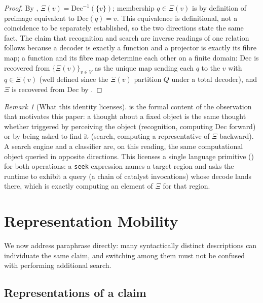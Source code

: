 \documentclass[11pt,twocolumn,a4paper]{article}
\theoremstyle{thmstyle}
\theoremstyle{definition}
\theoremstyle{remark}
\newtheorem{remark}[theorem]{Remark}
\newcommand{\V}{V}
\newcommand{\Proj}{\Xi}
\begin{document}
\begin{proof}
By , $\Proj(v)=\mathrm{Dec}^{-1}(\{v\})$; membership
$q\in\Proj(v)$ is by definition of preimage equivalent to
$\mathrm{Dec}(q)=v$. This equivalence is definitional, not a coincidence to
be separately established, so the two directions state the same fact. The
claim that recognition and search are inverse readings of one relation
follows because a decoder is exactly a function and a projector is exactly
its fibre map; a function and its fibre map determine each other on a
finite domain: $\mathrm{Dec}$ is recovered from $\{\Proj(v)\}_{v\in\V}$ as
the unique map sending each $q$ to the $v$ with $q\in\Proj(v)$ (well
defined since the $\Proj(v)$ partition $Q$ under a total decoder), and
$\Proj$ is recovered from $\mathrm{Dec}$ by .
\end{proof}

\begin{remark}[What this identity licenses]
\label{rem:identity-licenses}
 is the formal content of the observation
that motivates this paper: a thought about a fixed object is the same
thought whether triggered by perceiving the object (recognition, computing
$\mathrm{Dec}$ forward) or by being asked to find it (search, computing a
representative of $\Proj$ backward). A search engine and a classifier are,
on this reading, the same computational object queried in opposite
directions. This licenses a single language primitive
() for both operations: a \texttt{seek} expression names
a target region and asks the runtime to exhibit a query (a chain of
catalyst invocations) whose decode lands there, which is exactly computing
an element of $\Proj$ for that region.
\end{remark}

\section{Representation Mobility}
\label{sec:representation}

We now address paraphrase directly: many syntactically distinct
descriptions can individuate the same claim, and switching among them
must not be confused with performing additional search.

\subsection{Representations of a claim}
\end{document}
